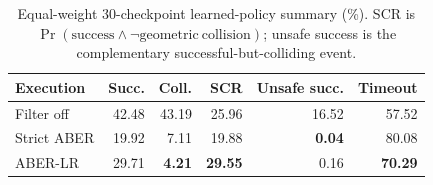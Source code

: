 \begin{table}[t]
\centering
\small
\setlength{\tabcolsep}{2.6pt}
\begin{tabular}{lrrrrr}
\toprule
Execution & Succ. & Coll. & SCR & Unsafe succ. & Timeout\\
\midrule
Filter off & 42.48 & 43.19 & 25.96 & 16.52 & 57.52\\
Strict ABER & 19.92 & 7.11 & 19.88 & \textbf{0.04} & 80.08\\
ABER-LR & 29.71 & \textbf{4.21} & \textbf{29.55} & 0.16 & \textbf{70.29}\\
\bottomrule
\end{tabular}
\caption{Equal-weight 30-checkpoint learned-policy summary (\%).  SCR is
$\Pr(\mathrm{success}\land\neg\mathrm{geometric\ collision})$; unsafe
success is the complementary successful-but-colliding event.}
\label{tab:aber-lr-summary}
\end{table}
